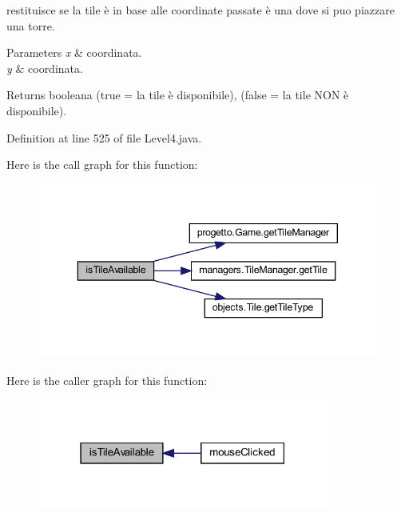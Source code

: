 restituisce se la tile è in base alle coordinate passate è una dove si puo piazzare una torre. 


\begin{DoxyParams}{Parameters}
{\em x} & coordinata. \\
\hline
{\em y} & coordinata.\\
\hline
\end{DoxyParams}
\begin{DoxyReturn}{Returns}
booleana (true = la tile è disponibile), (false = la tile N\+ON è disponibile). 
\end{DoxyReturn}


Definition at line 525 of file Level4.\+java.

Here is the call graph for this function\+:\nopagebreak
\begin{figure}[H]
\begin{center}
\leavevmode
\includegraphics[width=343pt]{classscenes_1_1_level4_aaeac2ee6b3a920a21928ee7b3dc8e7a9_cgraph}
\end{center}
\end{figure}
Here is the caller graph for this function\+:\nopagebreak
\begin{figure}[H]
\begin{center}
\leavevmode
\includegraphics[width=271pt]{classscenes_1_1_level4_aaeac2ee6b3a920a21928ee7b3dc8e7a9_icgraph}
\end{center}
\end{figure}
\mbox{\label{classscenes_1_1_level4_ab68417e6738c05037923f5f0f21eb586}} 
